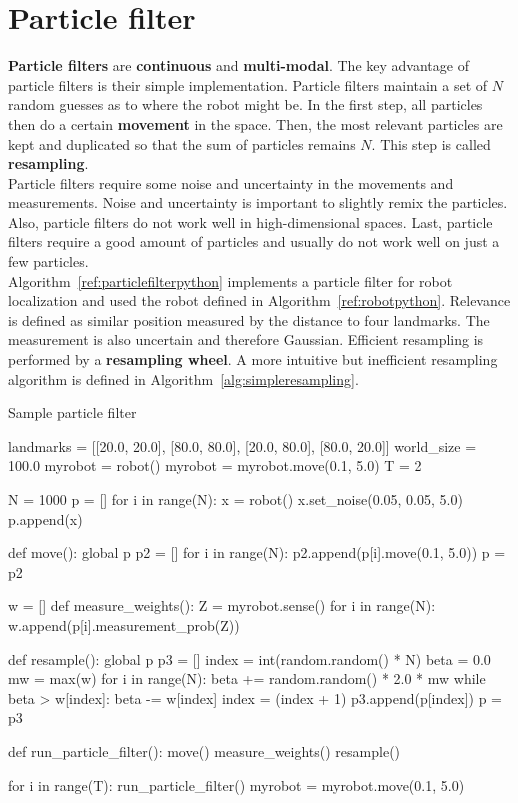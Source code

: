 \documentclass{report}
\begin{document}
\section{Particle filter}
{\bf Particle filters} are {\bf continuous} and {\bf multi-modal}. The key advantage of particle filters is their simple implementation. Particle filters maintain a set of $N$ random guesses as to where the robot might be. In the first step, all particles then do a certain {\bf movement} in the space. Then, the most relevant particles are kept and duplicated so that the sum of particles remains $N$. This step is called {\bf resampling}. \\
Particle filters require some noise and uncertainty in the movements and measurements. Noise and uncertainty is important to slightly remix the particles. Also, particle filters do not work well in high-dimensional spaces. Last, particle filters require a good amount of particles and usually do not work well on just a few particles.
\\
Algorithm~\ref{ref:particlefilterpython} implements a particle filter for robot localization and used the robot defined in Algorithm~\ref{ref:robotpython}. Relevance is defined as similar position measured by the distance to four landmarks. The measurement is also uncertain and therefore Gaussian. Efficient resampling is performed by a {\bf resampling wheel}.
A more intuitive but inefficient resampling algorithm is defined in Algorithm~\ref{alg:simpleresampling}.

\begin{algorithm}
\caption{Sample particle filter}
\label{ref:particlefilterpython}
\begin{python}
landmarks  = [[20.0, 20.0], [80.0, 80.0],
              [20.0, 80.0], [80.0, 20.0]]
world_size = 100.0
myrobot = robot()
myrobot = myrobot.move(0.1, 5.0)
T = 2

N = 1000
p = []
for i in range(N):
    x = robot()
    x.set_noise(0.05, 0.05, 5.0)
    p.append(x)

def move():
    global p
    p2 = []
    for i in range(N):
        p2.append(p[i].move(0.1, 5.0))
    p = p2

w = []
def measure_weights():
    Z = myrobot.sense()
    for i in range(N):
        w.append(p[i].measurement_prob(Z))

def resample():
    global p
    p3 = []
    index = int(random.random() * N)
    beta = 0.0
    mw = max(w)
    for i in range(N):
        beta += random.random() * 2.0 * mw
        while beta > w[index]:
            beta -= w[index]
            index = (index + 1) %
        p3.append(p[index])
    p = p3

def run_particle_filter():
    move()
    measure_weights()
    resample()

for i in range(T):
    run_particle_filter()
    myrobot = myrobot.move(0.1, 5.0)
\end{python}
\end{algorithm}
\end{document}

